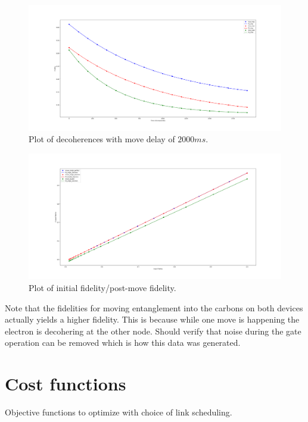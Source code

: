 \documentclass{article}
\begin{document}
\begin{figure}[!htb]
    \centering
    \includegraphics[width=\textwidth]{figures/decoherence_move_delay_2000ms.png}
    \caption{Plot of decoherences with move delay of $2000ms$.}
    \label{fig:decoherence_2000_delay}
\end{figure}

\begin{figure}[!htb]
    \centering
    \includegraphics[width=\textwidth]{figures/move_decoherence.png}
    \caption{Plot of initial fidelity/post-move fidelity.}
    \label{fig:decoherence_move}
\end{figure}

Note that the fidelities for moving entanglement into the carbons on both devices actually yields a higher fidelity.  This is because while one move is happening the electron is decohering at the other node.  Should verify that noise during the gate operation can be removed which is how this data was generated.

\section{Cost functions}
Objective functions to optimize with choice of link scheduling.
\end{document}
